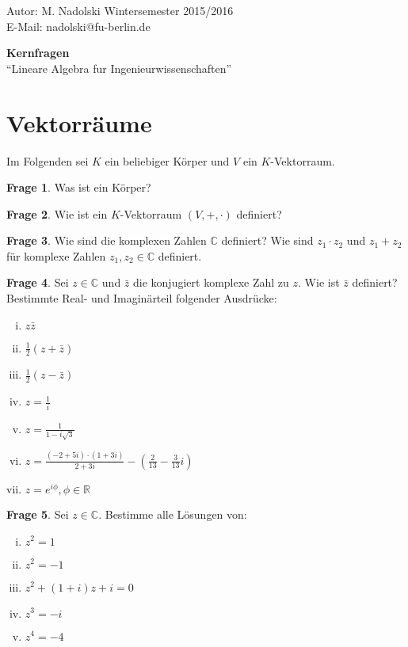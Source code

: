 \documentclass[11pt]{scrartcl}
\theoremstyle{definition}
\newtheorem{frage}{Frage}
\newcommand{\R}{\mathbb R}
\newcommand{\C}{\mathbb C}
\begin{document}
{\raggedleft Autor: M. Nadolski \hfill Wintersemester 2015/2016}\\
E-Mail: nadolski@fu-berlin.de

\begin{center}
\LARGE\textbf {Kernfragen}\\
\large ``Lineare Algebra fur Ingenieurwissenschaften''
\end{center}

\section {Vektorräume}

Im Folgenden sei $K$ ein beliebiger Körper und $V$ ein $K$-Vektorraum.

\begin{frage}
Was ist ein Körper?
\end{frage}

\begin{frage}
Wie ist ein $K$-Vektorraum $(V, +, \cdot)$ definiert?
\end{frage}

\begin{frage}
Wie sind die komplexen Zahlen $\C$ definiert? Wie sind $z_1 \cdot z_2$
und $z_1 + z_2$ für komplexe Zahlen $z_1, z_2 \in \C$ definiert.
\end{frage}

\begin{frage}
Sei $z \in \C$ und $\bar z$ die konjugiert komplexe Zahl zu $z$. Wie ist
$\bar z$ definiert? Bestimmte Real- und Imaginärteil folgender Ausdrücke:
\begin{enumerate}[(i)]
    \item $z \bar z$
    \item $\frac 12 ( z + \bar z )$
    \item $\frac 12 ( z - \bar z )$
    \item $z = \frac 1 i$
    \item $z = \frac 1 {1 - i \sqrt 3}$
    \item $z = \frac {(-2 + 5i) \cdot (1 + 3i)}{2 + 3i} 
             - \left( \frac 2 {13} - \frac 3 {13} i \right)$
    \item $z = e^{i \phi}, \phi \in \R$
\end{enumerate}
\end{frage}

\begin{frage}
Sei $z \in \C$. Bestimme alle Lösungen von:
\begin{enumerate}[(i)]
    \item $z^2 = 1$
    \item $z^2 = -1$
    \item $z^2 + (1 + i) z + i = 0$
    \item $z^3 = -i$
    \item $z^4 = -4$
\end{enumerate}
\end{frage}
\end{document}

